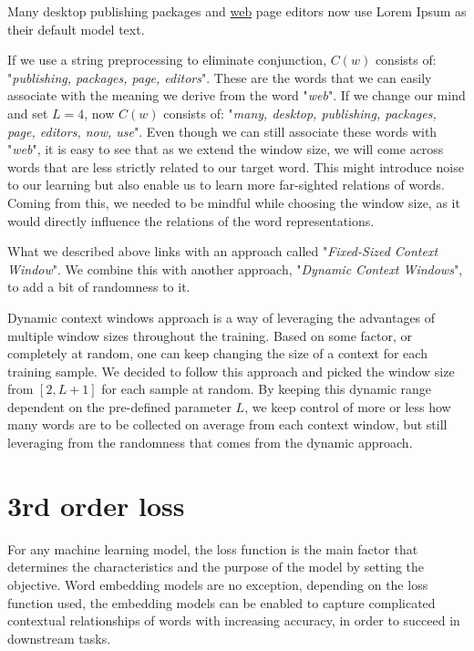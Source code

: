 \begin{displayquote}
Many desktop publishing packages and \underline{web} page editors now use Lorem Ipsum as their default model text.
\end{displayquote}

If we use a string preprocessing to eliminate conjunction, $C(w)$ consists of: "\textit{publishing, packages, page, editors}". These are the words that we can easily associate with the meaning we derive from the word "\textit{web}". If we change our mind and set $L=4$, now $C(w)$ consists of: "\textit{many, desktop, publishing, packages, page, editors, now, use}". Even though we can still associate these words with "\textit{web}", it is easy to see that as we extend the window size, we will come across words that are less strictly related to our target word. This might introduce noise to our learning but also enable us to learn more far-sighted relations of words. Coming from this, we needed to be mindful while choosing the window size, as it would directly influence the relations of the word representations.

What we described above links with an approach called "\textit{Fixed-Sized Context Window}". We combine this with another approach, "\textit{Dynamic Context Windows}", to add a bit of randomness to it.

Dynamic context windows approach is a way of leveraging the advantages of multiple window sizes throughout the training. Based on some factor, or completely at random, one can keep changing the size of a context for each training sample. We decided to follow this approach and picked the window size from $[2, L+1]$ for each sample at random. By keeping this dynamic range dependent on the pre-defined parameter $L$, we keep control of more or less how many words are to be collected on average from each context window, but still leveraging from the randomness that comes from the dynamic approach.

\section{3rd order loss}
\label{sec:loss}

For any machine learning model, the loss function is the main factor that determines the characteristics and the purpose of the model by setting the objective. Word embedding models are no exception, depending on the loss function used, the embedding models can be enabled to capture complicated contextual relationships of words with increasing accuracy, in order to succeed in downstream tasks.

